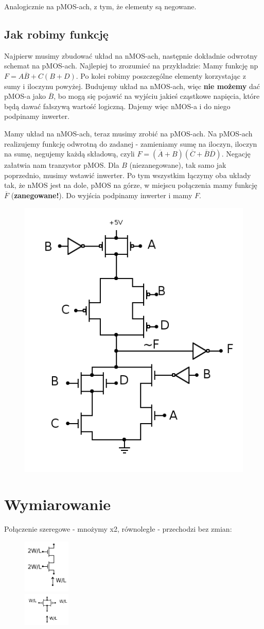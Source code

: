\documentclass[10pt,a4paper]{article}
\begin{document}
Analogicznie na pMOS-ach, z tym, że elementy są negowane.
\subsection{Jak robimy funkcję}
Najpierw musimy zbudować układ na nMOS-ach, następnie dokładnie odwrotny schemat na pMOS-ach. Najlepiej to zrozumieć na przykładzie:
Mamy funkcję np $F=A\overline{B}+C(B+D)$. Po kolei robimy poszczególne elementy korzystając z sumy i iloczynu powyżej. Budujemy układ na nMOS-ach, więc \textbf{nie możemy} dać pMOS-a jako $\overline{B}$, bo mogą się pojawić na wyjściu jakieś cząstkowe napięcia, które będą dawać fałszywą wartość logiczną. Dajemy więc nMOS-a i do niego podpinamy inwerter. 

Mamy układ na nMOS-ach, teraz musimy zrobić na pMOS-ach. Na pMOS-ach realizujemy funkcję odwrotną do zadanej - zamieniamy sumę na iloczyn, iloczyn na sumę, negujemy każdą składową, czyli $F=(\overline{A}+B)(\overline{C}+\overline{B}\overline{D})$. Negację załatwia nam tranzystor pMOS. Dla $B$ (niezanegowane), tak samo jak poprzednio, musimy wstawić inwerter. Po tym wszystkim łączymy oba układy tak, że nMOS jest na dole, pMOS na górze, w miejscu połączenia mamy funkcję $\overline{F}$ (\textbf{zanegowane!}). Do wyjścia podpinamy inwerter i mamy $F$.

\begin{figure}[H]
\centering
\includegraphics[height=0.5\textwidth]{F.png}
\end{figure}

\section{Wymiarowanie}
Połączenie szeregowe - mnożymy x2, równoległe - przechodzi bez zmian:
\begin{figure}[H]
\centering
\includegraphics[width=0.2\textwidth]{wymiar_szer.png}\\
\includegraphics[width=0.2\textwidth]{wymiar_rown.png}
\end{figure}
\end{document}
